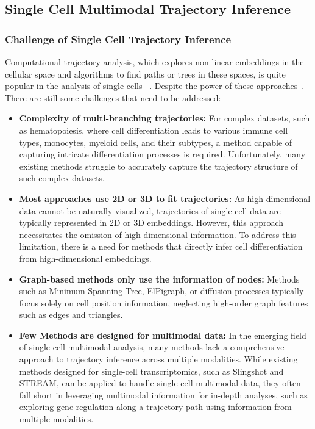 \subsection{Single Cell Multimodal Trajectory Inference}
\subsubsection{Challenge of Single Cell Trajectory Inference}
\label{background:sec2:challenge_TI}

Computational trajectory analysis, which explores non-linear embeddings in the cellular space and algorithms to find paths or trees in these spaces, is quite popular in the analysis of single cells ~\citep{wolf2019paga,chen2019stream,street2018slingshot,Lynch2022}. Despite the power of these approaches~\cite{Saelens2019}. There are still some challenges that need to be addressed:

\begin{itemize}
	\item \textbf{Complexity of multi-branching trajectories:} 
	For complex datasets, such as hematopoiesis, where cell differentiation leads to various immune cell types, monocytes, myeloid cells, and their subtypes, a method capable of capturing intricate differentiation processes is required. Unfortunately, many existing methods struggle to accurately capture the trajectory structure of such complex datasets.

	\item \textbf{Most approaches use 2D or 3D to fit trajectories:} 
	As high-dimensional data cannot be naturally visualized, trajectories of single-cell data are typically represented in 2D or 3D embeddings. However, this approach necessitates the omission of high-dimensional information. To address this limitation, there is a need for methods that directly infer cell differentiation from high-dimensional embeddings. 

	\item \textbf{Graph-based methods only use the information of nodes:} 
	Methods such as Minimum Spanning Tree, ElPigraph, or diffusion processes typically focus solely on cell position information, neglecting high-order graph features such as edges and triangles.   

	\item \textbf{Few Methods are designed for multimodal data:} 
	In the emerging field of single-cell multimodal analysis, many methods lack a comprehensive approach to trajectory inference across multiple modalities. While existing methods designed for single-cell transcriptomics, such as Slingshot and STREAM, can be applied to handle single-cell multimodal data, they often fall short in leveraging multimodal information for in-depth analyses, such as exploring gene regulation along a trajectory path using information from multiple modalities.
\end{itemize}

